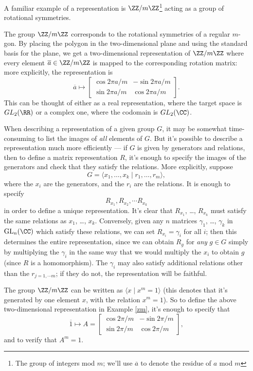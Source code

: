 A familiar example of a representation is $\ZZ/m\ZZ$\footnote{The group of integers mod $m$; we'll use $\overline{a}$ to denote the residue of $a$ mod $m$} acting as a group of rotational symmetries.
\begin{example}\label{zm}
The group $\ZZ/m\ZZ$ corresponds to the rotational symmetries of a regular $m$-gon. By placing the polygon in the two-dimensional plane and using the standard basis for the plane, we get a two-dimensional representation of $\ZZ/m\ZZ$ where every element $\overline{a} \in \ZZ/m\ZZ$ is mapped to the corresponding rotation matrix: more explicitly, the representation is \[\overline{a} \mapsto \begin{bmatrix} \cos 2\pi a/m & -\sin 2\pi a/m \\ \sin 2\pi a/m & \cos 2\pi a/m \end{bmatrix}.\] This can be thought of either as a real representation, where the target space is $GL_2(\RR)$ or a complex one, where the codomain is $GL_2(\CC)$. 
\end{example}

When describing a representation of a given group $G$, it may be somewhat time-consuming to list the images of \emph{all} elements of $G$. But it's possible to describe a representation much more efficiently --- if $G$ is given by generators and relations, then to define a matrix representation $R$, it's enough to specify the images of the generators and check that they satisfy the relations. More explicitly, suppose \[G = \langle x_1, \ldots, x_k \mid r_1, \ldots, r_m \rangle,\] where the $x_i$ are the generators, and the $r_i$ are the relations. It is enough to specify \[R_{x_1}, R_{x_2}, \cdots R_{x_k}\] in order to define a unique representation. It's clear that $R_{x_1}$, \ldots, $R_{x_k}$ must satisfy the same relations as $x_1$, \ldots, $x_k$. Conversely, given any $n$ matrices $\gamma_1$, \ldots, $\gamma_k$ in $\operatorname{GL}_n(\CC)$ which satisfy these relations, we can set $R_{x_i} = \gamma_i$ for all $i$; then this determines the entire representation, since we can obtain $R_g$ for \emph{any} $g \in G$ simply by multiplying the $\gamma_i$ in the same way that we would multiply the $x_i$ to obtain $g$ (since $R$ is a homomorphism). The $\gamma_i$ may also satisfy additional relations other than the $r_{j = 1, \cdots m}$; if they do not, the representation will be faithful. 

\begin{example}
The group $\ZZ/m\ZZ$ can be written as $\langle x \mid x^m = 1\rangle$ (this denotes that it's generated by one element $x$, with the relation $x^m = 1$). So to define the above two-dimensional representation in Example \ref{zm}, it's enough to specify that \[\overline{1} \mapsto A = \begin{bmatrix}
    \cos 2\pi/m & -\sin 2\pi/m \\
    \sin 2\pi/m & \cos 2\pi/m
    \end{bmatrix},\]
    and to verify that $A^m = 1$.
\end{example}

